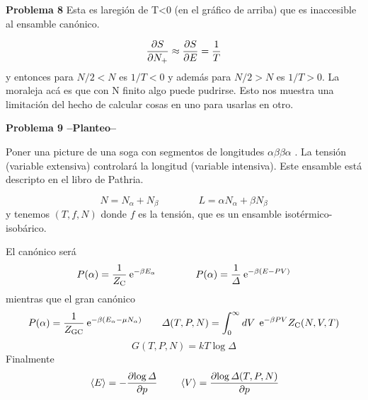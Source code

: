\documentclass[10pt,oneside]{CBFT_book}
\begin{document}
\begin{ejemplo}{\bf Problema 8}
Esta es laregión de T<0 (en el gráfico de arriba) que es inaccesible al ensamble canónico.

\[
	\frac{\partial^{\hspace{-0.05em}} {S}}{\partial {N_+}^{\hspace{-0.05em}}} \approx \frac{\partial^{\hspace{-0.05em}} {S}}{\partial {E}^{\hspace{-0.05em}}} = \frac{1}{T}
\]
y entonces para $N/2 < N$ es $1/T < 0$ y además para $ N/2 > N$ es $1/T > 0$.
La moraleja acá es que con N finito algo puede pudrirse.
Esto nos muestra una limitación del hecho de calcular cosas en uno para usarlas en otro.
 
 
\end{ejemplo}

\begin{ejemplo}{\bf Problema 9 --Planteo--}
 
Poner una picture de una soga con segmentos de longitudes $\alpha \beta \beta \alpha$ .
La tensión (variable extensiva) controlará la longitud (variable intensiva).
Este ensamble está descripto en el libro de Pathria.

\[
	N = N_\alpha + N_\beta \qquad \qquad L = \alpha N_\alpha + \beta N_\beta
\]
y tenemos $(T,f,N)$ donde $f$ es la tensión, que es un ensamble isotérmico-isobárico.

El canónico será
\[
	P(\alpha) = \frac{1}{Z_\text{C}} \:\mathrm{e}^{-\beta E_\alpha} \qquad \qquad 
	P(\alpha) = \frac{1}{\Delta} \:\mathrm{e}^{-\beta (E - PV) }
\]
mientras que el gran canónico 
\[
	P(\alpha) = \frac{1}{Z_\text{GC}} \:\mathrm{e}^{-\beta( E_\alpha - \mu N_\alpha ) } \qquad 
	\Delta(T,P,N) = \int_0^\infty dV \: \:\mathrm{e}^{ - \beta P V }  Z_\text{C}(N,V,T)
\]
\[
	G(T,P,N) = k T \log \Delta 
\]
Finalmente
\[
	\:\left\langle E \right\rangle = - \frac{\partial^{\hspace{-0.05em}} {\log \Delta }}{\partial {p}^{\hspace{-0.05em}}} \qquad \:\left\langle V \right\rangle = \frac{\partial^{\hspace{-0.05em}} {\log \Delta (T,P,N)}}{\partial {p}^{\hspace{-0.05em}}}
\]
 
\end{ejemplo}
\end{document}

